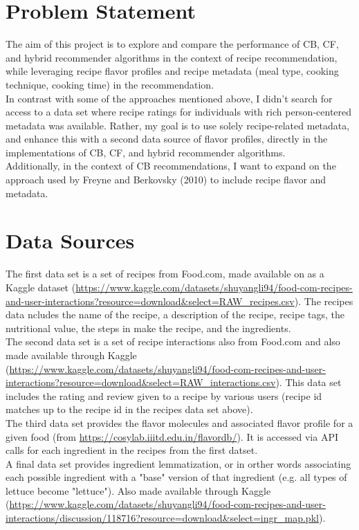 \documentclass{article}
\begin{document}
\section{Problem Statement}
The aim of this project is to explore and compare the performance of CB, CF, and hybrid recommender algorithms in the context of recipe recommendation, while leveraging recipe flavor profiles and recipe metadata (meal type, cooking technique, cooking time) in the recommendation.
\vspace{0.1in}
\\
In contrast with some of the approaches mentioned above, I didn't search for access to a data set where recipe ratings for individuals with rich person-centered metadata was available. Rather, my goal is to use solely recipe-related metadata, and enhance this with a second data source of flavor profiles, directly in the implementations of CB, CF, and hybrid recommender algorithms. 
\vspace{0.1in}
\\
Additionally, in the context of CB recommendations, I want to expand on the approach used by Freyne and Berkovsky (2010) to include recipe flavor and metadata. 

\section{Data Sources}

The first data set is a set of recipes from Food.com, made available on as a Kaggle dataset (\url{https://www.kaggle.com/datasets/shuyangli94/food-com-recipes-and-user-interactions?resource=download&select=RAW_recipes.csv}). The recipes data ncludes the name of the recipe, a description of the recipe, recipe tags, the nutritional value, the steps in make the recipe, and the ingredients. 
\vspace{0.1in}
\\
The second data set is a set of recipe interactions also from Food.com and also made available through Kaggle (\url{https://www.kaggle.com/datasets/shuyangli94/food-com-recipes-and-user-interactions?resource=download&select=RAW_interactions.csv}). This data set includes the rating and review given to a recipe by various users (recipe id matches up to the recipe id in the recipes data set above). 
\vspace{0.1in}
\\
The third data set provides the flavor molecules and associated flavor profile for a given food (from \url{https://cosylab.iiitd.edu.in/flavordb/}). It is accessed via API calls for each ingredient in the recipes from the first datset. 
\vspace{0.1in}
\\
A final data set provides ingredient lemmatization, or in orther words associating each possible ingredient with a "base" version of that ingredient (e.g. all types of lettuce become "lettuce"). Also made available through Kaggle (\url{https://www.kaggle.com/datasets/shuyangli94/food-com-recipes-and-user-interactions/discussion/118716?resource=download&select=ingr_map.pkl}).
\end{document}
